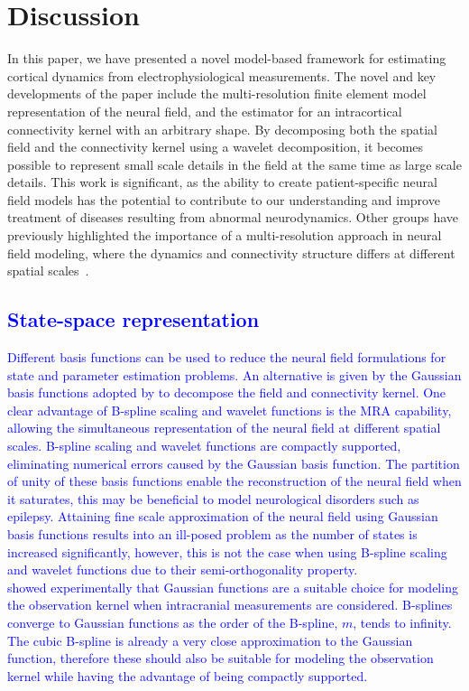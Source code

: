 \documentclass[review,authoryear,3p]{elsarticle}
\newcommand{\parham}[1]{\textcolor{blue}{#1}}
\begin{document}
\section{Discussion}
In this paper, we have presented a novel model-based framework for estimating cortical dynamics from electrophysiological measurements. The novel and key developments of the paper include the multi-resolution finite element model representation of the neural field, and the estimator for an intracortical connectivity kernel with an arbitrary shape. By decomposing both the spatial field and the connectivity kernel using a wavelet decomposition, it becomes possible to represent small scale details in the field at the same time as large scale details. This work is significant, as the ability to create patient-specific neural field models has the potential to contribute to our understanding and improve treatment of diseases resulting from abnormal neurodynamics. Other groups have previously highlighted the importance of a multi-resolution approach in neural field modeling, where the dynamics and connectivity structure differs at different spatial scales~\citep{Jirsa2002,Jirsa2004,Breakspear2005,Qubbaj2009,Schultze-Kraft2011}. 
\parham{\subsection{State-space representation}
Different basis functions can be used to reduce the neural field formulations for state and parameter estimation problems. An alternative is given by the Gaussian basis functions adopted by \cite{Freestone2011} to decompose the field and connectivity kernel. One clear advantage of B-spline scaling and wavelet functions is the MRA capability, allowing the simultaneous representation of the neural field at different spatial scales. B-spline scaling and wavelet functions are compactly supported, eliminating  numerical errors caused by the Gaussian basis function. The partition of unity of these basis functions enable the reconstruction of the neural field when it saturates, this may be beneficial to model neurological disorders such as epilepsy. Attaining fine scale approximation of the neural field using Gaussian basis functions results into an ill-posed problem as the number of states is increased significantly, however, this is not the case when using B-spline scaling and wavelet functions due to their semi-orthogonality property.\\ \cite{Freestone2011} showed experimentally that Gaussian functions are a suitable choice for modeling the observation kernel when intracranial measurements are considered. B-splines converge to Gaussian functions as the order of the B-spline, $m$, tends to infinity. The cubic B-spline is already a very close approximation to the Gaussian function, therefore these should also be suitable for modeling the observation kernel while having the advantage of being compactly supported.}
\end{document}
